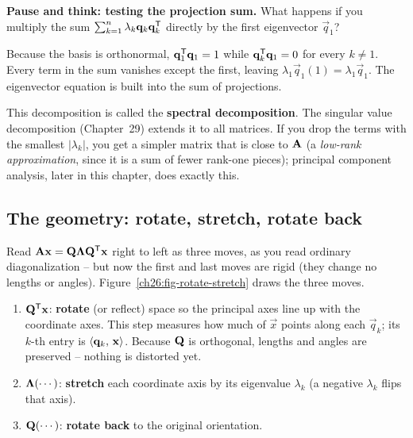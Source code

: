 \begin{recoverybox}
\textbf{Pause and think: testing the projection sum.} What happens if you
multiply the sum $\sum_{k=1}^n \lambda_k \mathbf{q}_k\mathbf{q}_k^{\mathsf{T}}$ directly by
the first eigenvector $\vec{q}_1$?

Because the basis is orthonormal, $\mathbf{q}_1^{\mathsf{T}}\mathbf{q}_1 = 1$ while
$\mathbf{q}_k^{\mathsf{T}}\mathbf{q}_1 = 0$ for every $k \neq 1$. Every term in the sum vanishes
except the first, leaving $\lambda_1\vec{q}_1(1) = \lambda_1\vec{q}_1$. The
eigenvector equation is built into the sum of projections.
\end{recoverybox}

This decomposition is called the \textbf{spectral decomposition}. The singular
value decomposition (Chapter~29) extends it to all matrices. If you drop the
terms with the smallest $|\lambda_k|$, you get a simpler matrix that is close to
$\mathbf{A}$ (a \emph{low-rank approximation}, since it is a sum of fewer rank-one
pieces); principal component analysis, later in this chapter, does exactly this.

\subsection{The geometry: rotate, stretch, rotate back}
\label{ch26:rotate-stretch}

Read $\mathbf{A}\mathbf{x} = \mathbf{Q}\mathbf{\Lambda}\mathbf{Q}^{\mathsf{T}}\mathbf{x}$ right to left as three
moves, as you read ordinary diagonalization -- but now the first and last
moves are rigid (they change no lengths or angles).
Figure~\ref{ch26:fig-rotate-stretch} draws the three moves.

\begin{enumerate}
  \item $\mathbf{Q}^{\mathsf{T}}\mathbf{x}$: \textbf{rotate} (or reflect) space so the principal
        axes line up with the coordinate axes. This step measures how much of
        $\vec{x}$ points along each $\vec{q}_k$; its $k$-th entry is
        $\langle \mathbf{q}_k,\, \mathbf{x} \rangle$. Because $\mathbf{Q}$ is orthogonal, lengths and
        angles are preserved -- nothing is distorted yet.
  \item $\mathbf{\Lambda}(\cdots)$: \textbf{stretch} each coordinate axis by its
        eigenvalue $\lambda_k$ (a negative $\lambda_k$ flips that axis).
  \item $\mathbf{Q}(\cdots)$: \textbf{rotate back} to the original orientation.
\end{enumerate}

